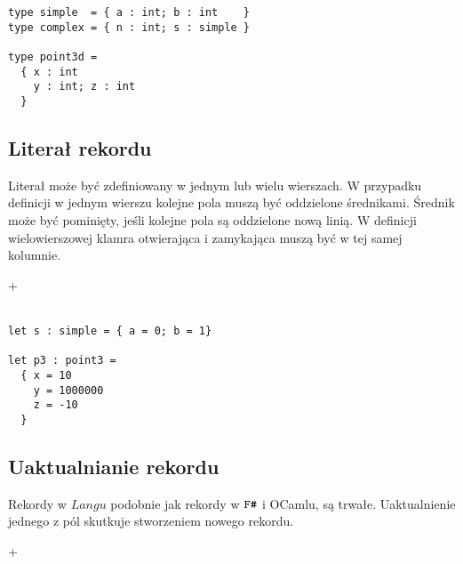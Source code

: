 \documentclass[declaration,shortabstract]{iithesis}
\begin{document}
\begin{lstlisting}[frame=single, caption=Definicja rekordu.]
type simple  = { a : int; b : int    }
type complex = { n : int; s : simple }

type point3d = 
  { x : int 
    y : int; z : int 
  }
\end{lstlisting}

\subsection{Literał rekordu}

Literał może być zdefiniowany w jednym lub wielu wierszach. W przypadku 
definicji w jednym wierszu kolejne pola muszą być oddzielone średnikami. 
Średnik może być pominięty, jeśli kolejne pola są oddzielone nową linią. 
W definicji wielowierszowej klamra otwierająca i zamykająca muszą być w tej 
samej kolumnie.

\begin{bnf*}
  {   \bnfts{=}  
    +  
  }\\
  {  \bnfts{ = } 
     \bnfor {} \bnfts{ = } 
    \bnfts{ ; }
  }\\
\end{bnf*}

\begin{lstlisting}[frame=single, caption=Literał rekordu.]
let s : simple = { a = 0; b = 1}

let p3 : point3 = 
  { x = 10
    y = 1000000 
    z = -10 
  }
\end{lstlisting}

\subsection{Uaktualnianie rekordu}

Rekordy w $Langu$ podobnie jak rekordy w $\verb!F#!$ i OCamlu, są trwałe. 
Uaktualnienie jednego z pól skutkuje stworzeniem nowego rekordu. 

\begin{bnf*}
  { \bnfts{ \{ }   
    + \bnfts{ \} } 
  }\\
  {  \bnfts{=} 
     \bnfor {} \bnfts{=} 
    \bnfts{;}
  }\\
\end{bnf*}
\end{document}
